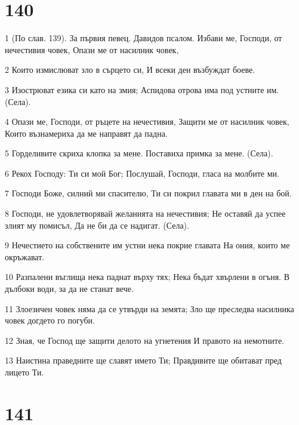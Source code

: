 \chapter{140}

\par 1 (По слав. 139). За първия певец. Давидов псалом. Избави ме, Господи, от нечестивия човек, Опази ме от насилник човек,
\par 2 Които измислюват зло в сърцето си, И всеки ден възбуждат боеве.
\par 3 Изострюват езика си като на змия; Аспидова отрова има под устните им. (Села).
\par 4 Опази ме, Господи, от ръцете на нечестивия, Защити ме от насилник човек, Които възнамериха да ме направят да падна.
\par 5 Горделивите скриха клопка за мене. Поставиха примка за мене. (Села).
\par 6 Рекох Господу: Ти си мой Бог; Послушай, Господи, гласа на молбите ми.
\par 7 Господи Боже, силний ми спасителю, Ти си покрил главата ми в ден на бой.
\par 8 Господи, не удовлетворявай желанията на нечестивия; Не оставяй да успее злият му помисъл, Да не би да се надигат. (Села).
\par 9 Нечестието на собствените им устни нека покрие главата На ония, които ме окръжават.
\par 10 Разпалени въглища нека паднат върху тях; Нека бъдат хвърлени в огъня. В дълбоки води, за да не станат вече.
\par 11 Злоезичен човек няма да се утвърди на земята; Зло ще преследва насилника човек догдето го погуби.
\par 12 Зная, че Господ ще защити делото на угнетения И правото на немотните.
\par 13 Наистина праведните ще славят името Ти; Правдивите ще обитават пред лицето Ти.

\chapter{141}

